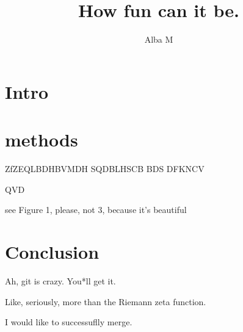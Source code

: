 \documentclass{article}
\author{Alba M}
\title{How fun can it be.}
\begin{document}
	\maketitle
	\section{Intro}
	\section{methods}
	ZfZEQLBDHBVMDH
	SQDBLHSCB
	BDS
	DFKNCV
	
	QVD
	
	see Figure 1, please, not 3, because it's beautiful
	
	\section{Conclusion}
	Ah, git is crazy. You*ll get it.
	
	Like, seriously, more than the Riemann zeta function.
	
	I would like to successuflly merge.
	
\end{document}
